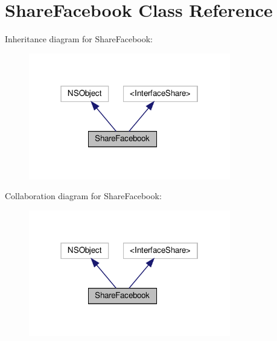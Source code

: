 \hypertarget{interfaceShareFacebook}{}\section{Share\+Facebook Class Reference}
\label{interfaceShareFacebook}


Inheritance diagram for Share\+Facebook\+:
\nopagebreak
\begin{figure}[H]
\begin{center}
\leavevmode
\includegraphics[width=250pt]{interfaceShareFacebook__inherit__graph}
\end{center}
\end{figure}


Collaboration diagram for Share\+Facebook\+:
\nopagebreak
\begin{figure}[H]
\begin{center}
\leavevmode
\includegraphics[width=250pt]{interfaceShareFacebook__coll__graph}
\end{center}
\end{figure}
